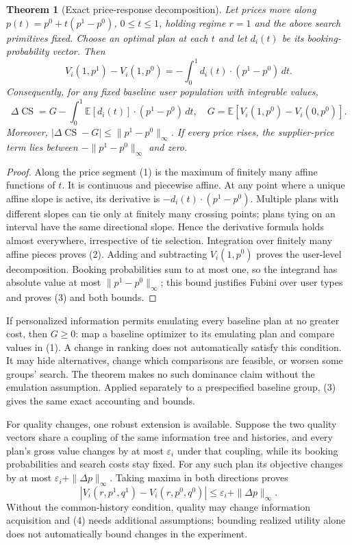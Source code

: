 \documentclass[11pt]{article}
\newtheorem{theorem}{Theorem}
\theoremstyle{remark}
\newcommand{\E}{\mathbb E}
\newcommand{\CS}{\operatorname{CS}}
\begin{document}
\begin{theorem}[Exact price-response decomposition]
Let prices move along $p(t)=p^0+t(p^1-p^0)$, $0\leq t\leq1$, holding regime $r=1$ and the above search primitives fixed. Choose an optimal plan at each $t$ and let $d_i(t)$ be its booking-probability vector. Then
\[
 V_i(1,p^1)-V_i(1,p^0)
   =-\int_0^1d_i(t)\cdot(p^1-p^0)\,dt.                  \tag{2}
\]
Consequently, for any fixed baseline user population with integrable values,
\[
 \Delta\CS=G-\int_0^1\E[d_i(t)]\cdot(p^1-p^0)\,dt,
 \quad G=\E[V_i(1,p^0)-V_i(0,p^0)].                      \tag{3}
\]
Moreover, $|\Delta\CS-G|\leq\|p^1-p^0\|_\infty$. If every price rises, the supplier-price term lies between $-\|p^1-p^0\|_\infty$ and zero.
\end{theorem}
\begin{proof}
Along the price segment (1) is the maximum of finitely many affine functions of $t$. It is continuous and piecewise affine. At any point where a unique affine slope is active, its derivative is $-d_i(t)\cdot(p^1-p^0)$. Multiple plans with different slopes can tie only at finitely many crossing points; plans tying on an interval have the same directional slope. Hence the derivative formula holds almost everywhere, irrespective of tie selection. Integration over finitely many affine pieces proves (2). Adding and subtracting $V_i(1,p^0)$ proves the user-level decomposition. Booking probabilities sum to at most one, so the integrand has absolute value at most $\|p^1-p^0\|_\infty$; this bound justifies Fubini over user types and proves (3) and both bounds.
\end{proof}

If personalized information permits emulating every baseline plan at no greater cost, then $G\geq0$: map a baseline optimizer to its emulating plan and compare values in (1). A change in ranking does not automatically satisfy this condition. It may hide alternatives, change which comparisons are feasible, or worsen some groups' search. The theorem makes no such dominance claim without the emulation assumption. Applied separately to a prespecified baseline group, (3) gives the same exact accounting and bounds.

For quality changes, one robust extension is available. Suppose the two quality vectors share a coupling of the same information tree and histories, and every plan's gross value changes by at most $\varepsilon_i$ under that coupling, while its booking probabilities and search costs stay fixed. For any such plan its objective changes by at most $\varepsilon_i+\|\Delta p\|_\infty$. Taking maxima in both directions proves
\[
 |V_i(r,p^1,q^1)-V_i(r,p^0,q^0)|
       \leq\varepsilon_i+\|\Delta p\|_\infty.            \tag{4}
\]
Without the common-history condition, quality may change information acquisition and (4) needs additional assumptions; bounding realized utility alone does not automatically bound changes in the experiment.
\end{document}
